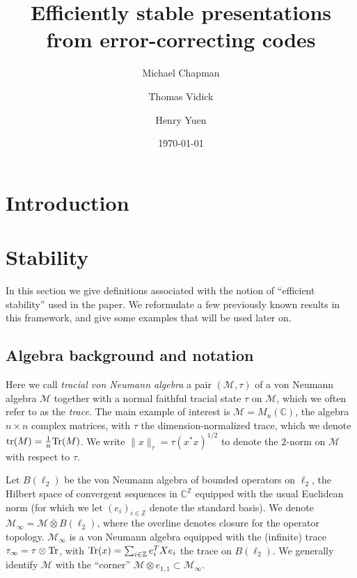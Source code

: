 \documentclass[11pt]{article}
\theoremstyle{definition}
\newcommand{\Tr}{\mbox{\rm Tr}}
\newcommand{\C}{\ensuremath{\mathbb{C}}}
\newcommand{\Z}{\ensuremath{\mathbb{Z}}}
\newcommand{\mM}{\ensuremath{\mathcal{M}}}
\DeclareMathOperator{\tr}{tr}
\begin{document}
\title{Efficiently stable presentations from error-correcting codes}

\author[1]{Michael Chapman}
\author[2]{Thomas Vidick}
\author[3]{Henry Yuen}
\affil[1]{}
\affil[2]{}
\affil[3]{}

\date{\today}
\maketitle

\noteswarning


\begin{abstract}

\end{abstract}


\section{Introduction}



\section{Stability}

In this section we give definitions associated with the notion of ``efficient stability'' used in the paper. We reformulate a few previously known results in this framework, and give some examples that will be used later on. 


	


\subsection{Algebra background and notation}

  Here we call \emph{tracial von Neumann algebra} a pair $(\mM,\tau)$ of a von Neumann algebra $\mM$ together with a normal faithful tracial state $\tau$ on $\mM$, which we often refer to as the \emph{trace}. The main example of interest is $\mM=M_n(\C)$, the algebra $n\times n$ complex matrices, with $\tau$ the dimension-normalized trace, which we denote $\tr(M)=\frac{1}{n}\Tr(M)$. 	We write $\|x\|_\tau=\tau(x^*x)^{1/2}$ to denote the $2$-norm on $\mM$ with respect to $\tau$. 
	
	Let $B(\ell_2)$ be the von Neumann algebra of bounded operators on $\ell_2$, the Hilbert space of convergent sequences in $\C^\Z$ equipped with the usual Euclidean norm (for which we let $(e_i)_{i \in \Z}$ denote the standard basis). We denote $\mM_\infty = \mM \overline{\otimes} B(\ell_2)$, where the overline denotes closure for the operator topology. $\mM_\infty$ is a von Neumann algebra equipped with the (infinite) trace $\tau_\infty = \tau \otimes \Tr$, with $\Tr(x)=\sum_{i\in \Z} e_i^T X e_i$ the trace on $B(\ell_2)$. We generally identify $\mM$ with the ``corner'' $\mM\otimes e_{1,1}\subset \mM_\infty$. 
\end{document}
